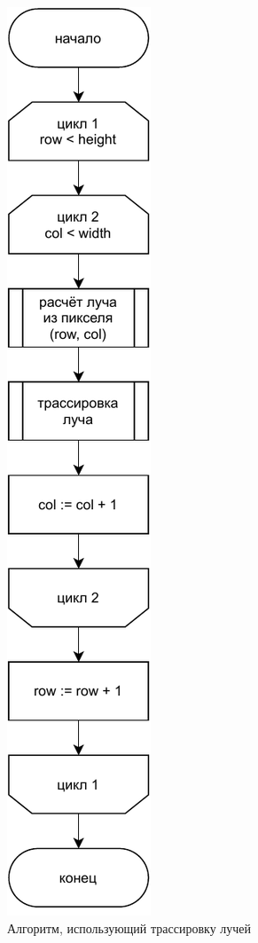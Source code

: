 \begin{figure}[h]
	\centering
	\includegraphics[width=\linewidth,height=0.7\textheight,keepaspectratio]{diagrams/fancy.pdf}
	\caption{Алгоритм, использующий трассировку лучей}
	\label{alg:fancy}
\end{figure}

